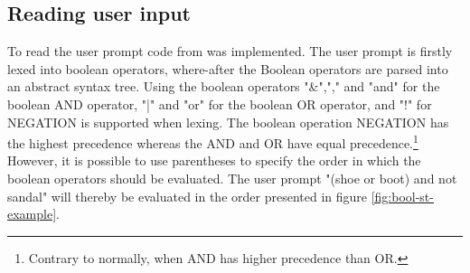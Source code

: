 \subsection{Reading user input}
To read the user prompt code from \cite{parsing_lexing} was implemented. The user prompt is firstly lexed into boolean operators, where-after the Boolean operators are parsed into an abstract syntax tree. Using the boolean operators "\&","," and "and" for the boolean AND operator, "|" and "or" for the boolean OR operator, and "!" for NEGATION is supported when lexing. The boolean operation NEGATION has the highest precedence whereas the AND and OR have equal precedence.\footnote{Contrary to normally, when AND has higher precedence than OR.} However, it is possible to use parentheses to specify the order in which the boolean operators should be evaluated. The user prompt "(shoe or boot) and not sandal" will thereby be evaluated in the order presented in figure \ref{fig:bool-st-example}.

